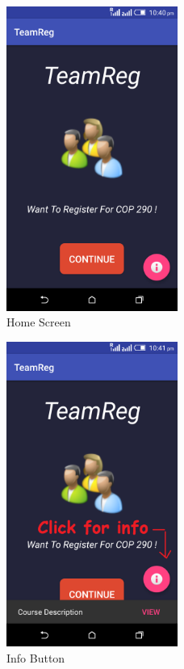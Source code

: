 \documentclass[12pt]{article}
\begin{document}
\begin{center}
\begin{figure}[!ht]
	\centering
	\includegraphics[width=0.5\textwidth]{1.png}
	\caption{Home Screen}
\end{figure}

\begin{figure}[!ht]
	\centering
	\includegraphics[width=0.5\textwidth]{2.png}
	\caption{Info Button}
\end{figure}


\end{center}
\end{document}

